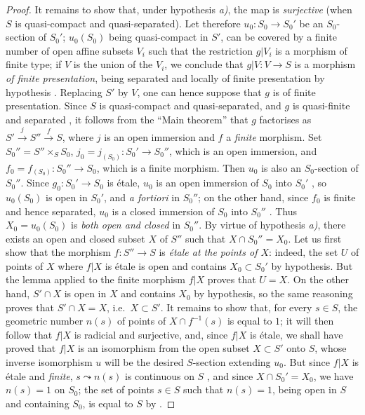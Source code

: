 \begin{proof}
It remains to show that, under hypothesis \emph{a)}, the map  is \emph{surjective} (when $S$ is quasi-compact and quasi-separated).
Let therefore $u_0:S_0\to S_0'$ be an $S_0$-section of $S_0'$;
$u_0(S_0)$ being quasi-compact in $S'$, can be covered by a finite number of open affine subsets $V_i$ such that the restriction $g|V_i$ is a morphism of finite type;
if $V$ is the union of the $V_i$, we conclude that $g|V:V\to S$ is a morphism \emph{of finite presentation}, being separated and locally of finite presentation by hypothesis .
Replacing $S'$ by $V$, one can hence suppose that $g$ is of finite presentation.
Since $S$ is quasi-compact and quasi-separated, and $g$ is quasi-finite and separated , it follows from the ``Main theorem''  that $g$ factorises as $S'\xrightarrow{j}S''\xrightarrow{f}S$, where $j$ is an open immersion and $f$ a \emph{finite} morphism.
Set $S_0''=S''\times_S S_0$, $j_0=j_{(S_0)}:S_0'\to S_0''$, which is an open immersion, and $f_0=f_{(S_0)}:S_0''\to S_0$, which is a finite morphism.
Then $u_0$ is also an $S_0$-section of $S_0''$.
Since $g_0:S_0'\to S_0$ is \'etale, $u_0$ is an open immersion of $S_0$ into $S_0'$ , so $u_0(S_0)$ is open in $S_0'$, and \emph{a fortiori} in $S_0''$;
on the other hand, since $f_0$ is finite and hence separated, $u_0$ is a closed immersion of $S_0$ into $S_0''$ .
Thus $X_0=u_0(S_0)$ is \emph{both open and closed} in $S_0''$.
By virtue of hypothesis \emph{a)}, there exists an open and closed subset $X$ of $S''$ such that $X\cap S_0''=X_0$.
Let us first show that the morphism $f:S''\to S$ is \emph{\'etale at the points of $X$}:
indeed, the set $U$ of points of $X$ where $f|X$ is \'etale is open and contains $X_0\subset S_0'$ by hypothesis.
But the lemma  applied to the finite morphism $f|X$ proves that $U=X$.
On the other hand, $S'\cap X$ is open in $X$ and contains $X_0$ by hypothesis, so the same reasoning proves that $S'\cap X=X$, i.e.\ $X\subset S'$.
It remains to show that, for every $s\in S$, the geometric number $n(s)$ of points of $X\cap f^{-1}(s)$ is equal to $1$;
it will then follow that $f|X$ is radicial and surjective, and, since $f|X$ is \'etale, we shall have proved  that $f|X$ is an isomorphism from the open subset $X\subset S'$ onto $S$, whose inverse isomorphism $u$ will be the desired $S$-section extending $u_0$.
But since $f|X$ is \'etale and \emph{finite}, $s\leadsto n(s)$ is continuous on $S$ , and since $X\cap S_0'=X_0$, we have $n(s)=1$ on $S_0$;
the set of points $s\in S$ such that $n(s)=1$, being open in $S$ and containing $S_0$, is equal to $S$ by .
\end{proof}

